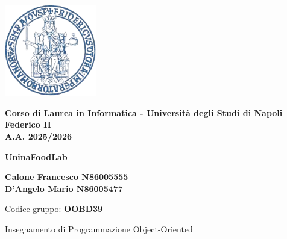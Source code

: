 \documentclass[11pt]{article}
\begin{document}
\thispagestyle{firstpage}


\begin{center}
    \includegraphics[width=0.3\textwidth]{latex/immagini/uni_logo.png} 
    \vspace{0.5cm}

    {\large \textbf{Corso di Laurea in Informatica - Università degli Studi di Napoli Federico II}}\\
    {\large \textbf{A.A. 2025/2026}}\\[1cm]
    \vspace{1cm}

    {\Huge \color{myblue} \textbf{UninaFoodLab}}\\[2cm]

    \begin{flushleft}
    \centering
    {\large
    \textbf{Calone Francesco N86005555}\\
    \vspace{0.2cm}
    \textbf{D'Angelo Mario N86005477}\\
    }
    
    \vspace{0.2cm}
    {\small Codice gruppo: \textbf{OOBD39}}\\
    \vspace{0.8cm} 

    {\small Insegnamento di Programmazione Object-Oriented}
    \end{flushleft}
\end{center}


\newpage

\pagestyle{normal}

\tableofcontents
\thispagestyle{normal}





















\end{document}
